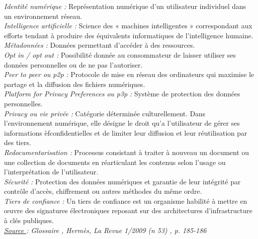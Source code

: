 \documentclass[a4paper,12pt]{article}
\begin{document}
\emph{Identité numérique :} Représentation numérique d’un utilisateur individuel dans un environnement réseau. \\


\emph{Intelligence artificielle :} Science des « machines intelligentes » correspondant aux efforts tendant à produire des équivalents informatiques de l’intelligence humaine. \\


\emph{Métadonnées :} Données permettant d’accéder à des ressources. \\


\emph{Opt in / opt out :} Possibilité donnée au consommateur de laisser utiliser ses données personnelles ou de ne pas l’autoriser. \\


\emph{Peer to peer ou p2p :} Protocole de mise en réseau des ordinateurs qui maximise le partage et la diffusion des fichiers numériques. \\


\emph{Platform for Privacy Preferences ou p3p :} Système de protection des données personnelles. \\


\emph{Privacy ou vie privée :} Catégorie déterminée culturellement. Dans l’environnement numérique, elle désigne le droit qu’a l’utilisateur de gérer ses informations èfconfidentielles et de limiter leur diffusion et leur réutilisation par des tiers. \\


\emph{Redocumentarisation :} Processus consistant à traiter à nouveau un document ou une collection de documents en réarticulant les contenus selon l’usage ou l’interprétation de l’utilisateur. \\


\emph{Sécurité :} Protection des données numériques et garantie de leur intégrité par contrôle d’accès, chiffrement ou autres méthodes du même ordre. \\


\emph{Tiers de confiance :} Un tiers de confiance est un organisme habilité à mettre en œuvre des signatures électroniques reposant sur des architectures d’infrastructure à clés publiques. \\



\emph{\underline{Source }: \emph{Glossaire }, Hermès, La Revue 1/2009 (n 53) , p. 185-186 }

\newpage
\nocite{*}

\end{document}
